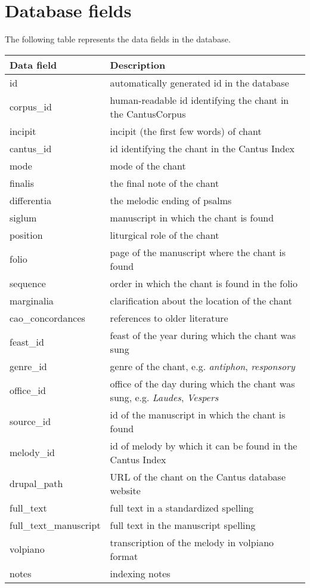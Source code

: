 \section{Database fields}
\label{section:db_fields}

The following table represents the data fields in the database.

\begin{longtable}{| p{} | p{} |} 

 \hline
 Data field & Description \\
 \hline
 id             & automatically generated id in the database \\ \hline
 corpus\_id     & human-readable id identifying the chant in the CantusCorpus \\ \hline
 incipit        & incipit (the first few words) of chant \\ \hline
 cantus\_id     & id identifying the chant in the Cantus Index \\ \hline
 mode           & mode of the chant \\ \hline
 finalis        & the final note of the chant \\ \hline
 differentia    & the melodic ending of psalms \\ \hline
 siglum         & manuscript in which the chant is found \\ \hline
 position       & liturgical role of the chant \\ \hline
 folio          & page of the manuscript where the chant is found \\ \hline
 sequence       & order in which the chant is found in the folio \\ \hline
 marginalia     & clarification about the location of the chant \\ \hline
 cao\_concordances & references to older literature \\ \hline
 feast\_id      & feast of the year during which the chant was sung \\ \hline
 genre\_id      & genre of the chant, e.g. \emph{antiphon}, \emph{responsory} \\ \hline
 office\_id     & office of the day during which the chant was sung, e.g. \emph{Laudes}, \emph{Vespers} \\ \hline
 source\_id     & id of the manuscript in which the chant is found \\ \hline
 melody\_id     & id of melody by which it can be found in the Cantus Index \\ \hline
 drupal\_path   & URL of the chant on the Cantus database website \\ \hline
 full\_text     & full text in a standardized spelling \\ \hline
 full\_text\_manuscript & full text in the manuscript spelling \\ \hline
 volpiano       & transcription of the melody in volpiano format \\ \hline
 notes          & indexing notes \\
 \hline


\end{longtable}
